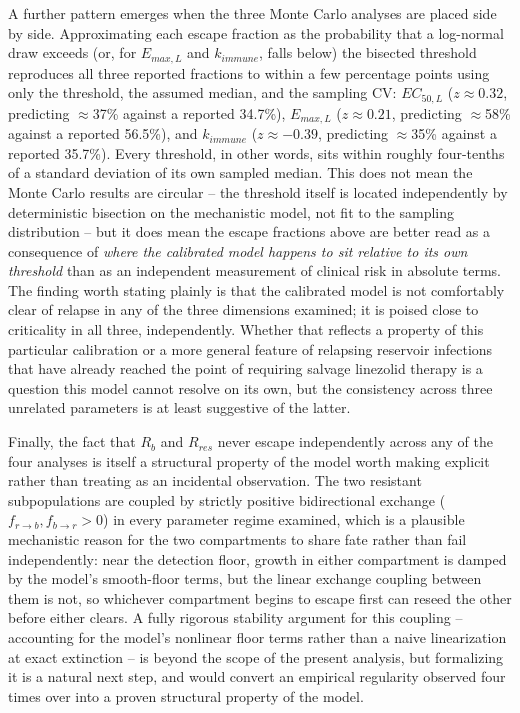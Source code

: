 \documentclass[11pt]{article}
\begin{document}
A further pattern emerges when the three Monte Carlo analyses are placed
side by side. Approximating each escape fraction as the probability that a
log-normal draw exceeds (or, for $E_{max,L}$ and $k_{immune}$, falls below)
the bisected threshold reproduces all three reported fractions to within a
few percentage points using only the threshold, the assumed median, and the
sampling $\mathrm{CV}$: $EC_{50,L}$ ($z \approx 0.32$, predicting
$\approx$37\% against a reported 34.7\%), $E_{max,L}$ ($z \approx 0.21$,
predicting $\approx$58\% against a reported 56.5\%), and $k_{immune}$
($z \approx -0.39$, predicting $\approx$35\% against a reported 35.7\%).
Every threshold, in other words, sits within roughly four-tenths of a
standard deviation of its own sampled median. This does not mean the Monte
Carlo results are circular -- the threshold itself is located independently
by deterministic
bisection on the mechanistic model, not fit to the sampling distribution --
but it does mean the escape fractions above are better read as a
consequence of \emph{where the calibrated model happens to sit relative to
its own threshold} than as an independent measurement of clinical risk in
absolute terms. The finding worth stating plainly is that the calibrated
model is not comfortably clear of relapse in any of the three dimensions
examined; it is poised close to criticality in all three, independently.
Whether that reflects a property of this particular calibration or a more
general feature of relapsing reservoir infections that have already reached
the point of requiring salvage linezolid therapy is a question this model
cannot resolve on its own, but the consistency across three unrelated
parameters is at least suggestive of the latter.

Finally, the fact that $R_b$ and $R_{res}$ never escape independently
across any of the four analyses is itself a structural property of the
model worth making explicit rather than treating as an incidental
observation. The two resistant subpopulations are coupled by strictly
positive bidirectional exchange ($f_{r \to b}, f_{b \to r} > 0$) in every
parameter regime examined, which is a plausible mechanistic reason for the
two compartments to share fate rather than fail independently: near the
detection floor, growth in either compartment is damped by the model's
smooth-floor terms, but the linear exchange coupling between them is not,
so whichever compartment begins to escape first can reseed the other before
either clears. A fully rigorous stability argument for this coupling --
accounting for the model's nonlinear floor terms rather than a naive
linearization at exact extinction -- is beyond the scope of the present
analysis, but formalizing it is a natural next step, and would convert an
empirical regularity observed four times over into a proven structural
property of the model.
\end{document}
